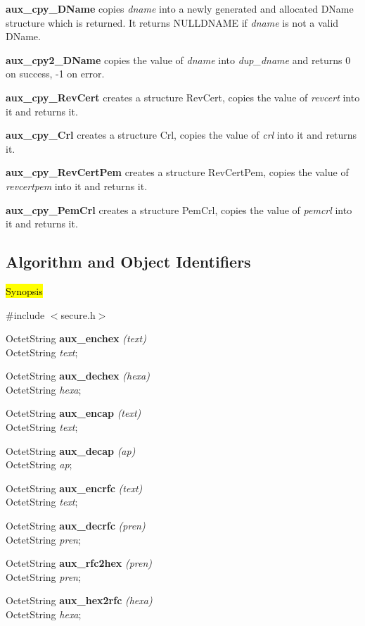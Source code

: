 {\bf aux\_cpy\_DName} copies {\em dname} into a newly generated and
allocated DName structure which is returned. It returns NULLDNAME
if {\em dname} is not a valid DName.

{\bf aux\_cpy2\_DName} copies the value of {\em dname} into {\em dup\_dname}
and returns 0 on success, -1 on error.

{\bf aux\_cpy\_RevCert} creates a structure RevCert, copies the value
of {\em revcert} into it and returns it.

{\bf aux\_cpy\_Crl} creates a structure Crl, copies the value
of {\em crl} into it and returns it.

{\bf aux\_cpy\_RevCertPem} creates a structure RevCertPem, copies the value
of {\em revcertpem} into it and returns it.

{\bf aux\_cpy\_PemCrl} creates a structure PemCrl, copies the value
of {\em pemcrl} into it and returns it.



\subsection{Algorithm and Object Identifiers}
\label{aux_encdec}
\hl{Synopsis}

\#include $<$secure.h$>$
 
OctetString  {\bf *aux\_enchex} {\em (text)} \\
OctetString {\em *text};

OctetString  {\bf *aux\_dechex} {\em (hexa)} \\
OctetString {\em *hexa};

OctetString  {\bf *aux\_encap} {\em (text)} \\
OctetString {\em *text};

OctetString  {\bf *aux\_decap} {\em (ap)} \\
OctetString {\em *ap};

OctetString  {\bf *aux\_encrfc} {\em (text)} \\
OctetString {\em *text};

OctetString  {\bf *aux\_decrfc} {\em (pren)} \\
OctetString {\em *pren};

OctetString  {\bf *aux\_rfc2hex} {\em (pren)} \\
OctetString {\em *pren};

OctetString  {\bf *aux\_hex2rfc} {\em (hexa)} \\
OctetString {\em *hexa};


